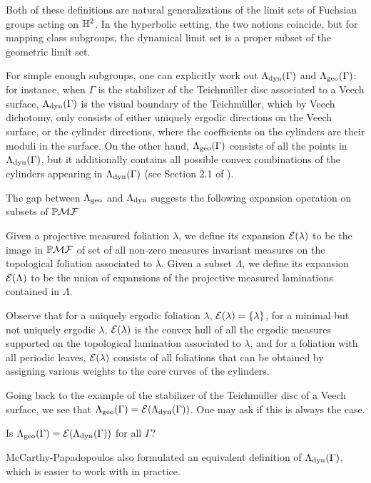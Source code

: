 \documentclass[12pt, reqno]{amsart}
\begin{document}
Both of these definitions are natural generalizations of the limit sets of Fuchsian groups acting on $\mathbb{H}^2$.
In the hyperbolic setting, the two notions coincide, but for mapping class subgroups, the dynamical limit set is a proper subset of the geometric limit set.

For simple enough subgroups, one can explicitly work out $\Lambda_{\mathrm{dyn}}(\Gamma)$ and $\Lambda_{\mathrm{geo}}(\Gamma)$: for instance, when $\Gamma$ is the stabilizer of the Teichmüller disc associated to a Veech surface, $\Lambda_{\mathrm{dyn}}(\Gamma)$ is the visual boundary of the Teichmüller, which by Veech dichotomy, only consists of either uniquely ergodic directions on the Veech surface, or the cylinder directions, where the coefficients on the cylinders are their moduli in the surface.
On the other hand, $\Lambda_{\mathrm{geo}}(\Gamma)$ consists of all the points in $\Lambda_{\mathrm{dyn}}(\Gamma)$, but it additionally contains all possible convex combinations of the cylinders appearing in $\Lambda_{\mathrm{dyn}}(\Gamma)$ (see Section 2.1 of \cite{2007math......2034K}).

The gap between $\Lambda_{\mathrm{geo}}$ and $\Lambda_{\mathrm{dyn}}$ suggests the following expansion operation on subsets of $\mathbb{P}\mathcal{MF}$
\begin{definition}[Expansion]
  Given a projective measured foliation $\lambda$, we define its expansion $\mathcal{E}(\lambda)$ to be the image in $\mathbb{P}\mathcal{MF}$ of set of all non-zero measures invariant measures on the topological foliation associated to $\lambda$.
  Given a subset $\Lambda$, we define its expansion $\mathcal{E}(\Lambda)$ to be the union of expansions of the projective measured laminations contained in $\Lambda$.
\end{definition}
Observe that for a uniquely ergodic foliation $\lambda$, $\mathcal{E}(\lambda) = \{\lambda\}$, for a minimal but not uniquely ergodic $\lambda$, $\mathcal{E}(\lambda)$ is the convex hull of all the ergodic measures supported on the topological lamination associated to $\lambda$, and for a foliation with all periodic leaves, $\mathcal{E}(\lambda)$ consists of all foliations that can be obtained by assigning various weights to the core curves of the cylinders.

Going back to the example of the stabilizer of the Teichmüller disc of a Veech surface, we see that $\Lambda_{\mathrm{geo}}(\Gamma) = \mathcal{E}(\Lambda_{\mathrm{dyn}}(\Gamma))$.
One may ask if this is always the case.
\begin{question}
  Is $\Lambda_{\mathrm{geo}}(\Gamma) = \mathcal{E}(\Lambda_{\mathrm{dyn}}(\Gamma))$ for all $\Gamma$?
\end{question}

McCarthy-Papadopoulos also formulated an equivalent definition of $\Lambda_{\mathrm{dyn}}(\Gamma)$, which is easier to work with in practice.
\end{document}
